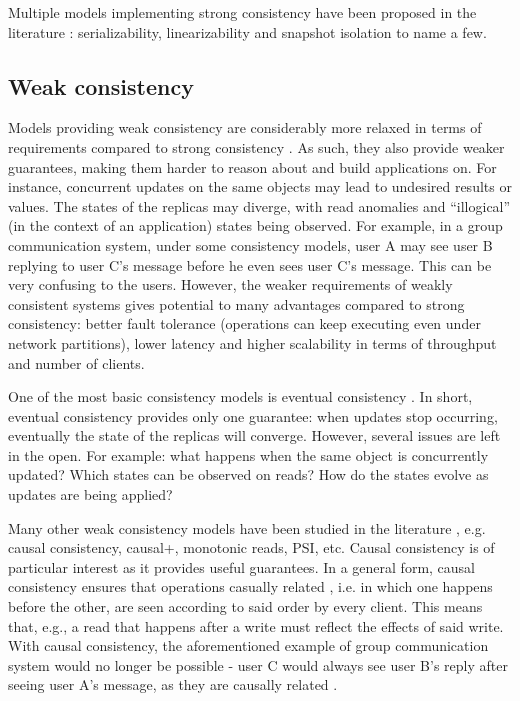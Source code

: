 Multiple models implementing strong consistency have been proposed in the literature  \cite{linearizability, si}: serializability, linearizability and snapshot isolation to name a few.

\subsection{Weak consistency}

Models providing weak consistency are considerably more relaxed in terms of requirements compared to strong consistency \cite{understandingEC}.
As such, they also provide weaker guarantees, making them harder to reason about and build applications on.
For instance, concurrent updates on the same objects may lead to undesired results or values.
The states of the replicas may diverge, with read anomalies and ``illogical'' (in the context of an application) states being observed.
For example, in a group communication system, under some consistency models, user A may see user B replying to user C's message before he even sees user C's message.
This can be very confusing to the users.
However, the weaker requirements of weakly consistent systems gives potential to many advantages compared to strong consistency: better fault tolerance (operations can keep executing even under network partitions), lower latency and higher scalability in terms of throughput and number of clients.

One of the most basic consistency models is eventual consistency \cite{understandingEC}.
In short, eventual consistency provides only one guarantee: when updates stop occurring, eventually the state of the replicas will converge.
However, several issues are left in the open. For example: what happens when the same object is concurrently updated? Which states can be observed on reads? How do the states evolve as updates are being applied?

Many other weak consistency models have been studied in the literature \cite{understandingEC, session, cops, dynamo, cassandra, walter}, e.g. causal consistency, causal+, monotonic reads, PSI, etc.
Causal consistency is of particular interest as it provides useful guarantees.
In a general form, causal consistency ensures that operations casually related  \cite{lamport2019time}, i.e. in which one happens before the other, are seen according to said order by every client.
This means that, e.g., a read that happens after a write must reflect the effects of said write.
With causal consistency, the aforementioned example of group communication system would no longer be possible - user C would always see user B's reply after seeing user A's message, as they are causally related \cite{lamport2019time, walter}.

